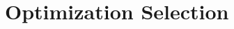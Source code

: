 \documentclass{sig-alternate}
\begin{document}
{%




\section{Optimization Selection}
\label{sec:partitioning}

}
\end{document}
